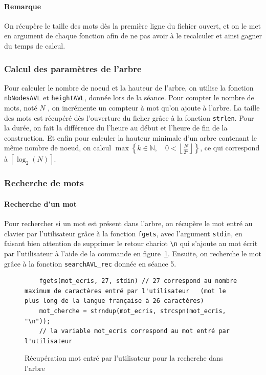\documentclass{article} %
\begin{document}
\paragraph{Remarque} On récupère le taille des mots dès la première ligne du fichier ouvert, et on le met en argument de chaque fonction afin de ne pas avoir à le recalculer et ainsi gagner du temps de calcul. 

\subsubsection{Calcul des paramètres de l'arbre}
Pour calculer le nombre de noeud et la hauteur de l'arbre, on utilise la fonction \texttt{nbNodesAVL} et \texttt{heightAVL}, donnée lors de la séance. Pour compter le nombre de mots, noté \(N\) , on incrémente un compteur à mot qu'on ajoute à l'arbre. La taille des mots est récupéré dès l'ouverture du ficher grâce à la fonction \texttt{strlen}. Pour la durée, on fait la différence du l'heure au début et l'heure de fin de la construction. Et enfin pour calculer la hauteur minimale d’un arbre contenant le même nombre de noeud, on calcul \(\displaystyle \max \left\lbrace k \in \mathbb{N}, \quad 0 < \left\lfloor  \frac{N}{2^k} \right\rfloor  \right\rbrace \), ce qui correspond à \(\left\lceil \log_2 (N) \right\rceil \). 

\subsubsection{Recherche de mots}

\paragraph{Recherche d'un mot}Pour rechercher si un mot est présent dans l'arbre, on récupère le mot entré au clavier par l'utilisateur grâce à la fonction \texttt{fgets}, avec l'argument \texttt{stdin}, en faisant bien attention de supprimer le retour chariot \texttt{\textbackslash n} qui s'ajoute au mot écrit par l'utilisateur à l'aide de la commande en figure~\ref{fig:recherche_mot}. Ensuite, on recherche le mot grâce à la fonction \texttt{searchAVL\_rec} donnée en séance 5. 

\begin{figure}[H]
  \begin{lstlisting}
    fgets(mot_ecris, 27, stdin) // 27 correspond au nombre maximum de caractères entré par l'utilisateur   (mot le plus long de la langue française à 26 caractères)
    mot_cherche = strndup(mot_ecris, strcspn(mot_ecris, "\n"));
    // la variable mot_ecris correspond au mot entré par l'utilisateur \end{lstlisting}
  
    \caption{Récupération mot entré par l'utilisateur pour la recherche dans l'arbre}
    \label{fig:recherche_mot}
\end{figure}
\end{document}
